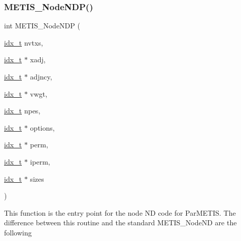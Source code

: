 \subsubsection{\texorpdfstring{M\+E\+T\+I\+S\+\_\+\+Node\+N\+D\+P()}{METIS\_NodeNDP()}}
{\footnotesize\ttfamily int M\+E\+T\+I\+S\+\_\+\+Node\+N\+DP (\begin{DoxyParamCaption}\item[{\hyperlink{a00876_aaa5262be3e700770163401acb0150f52}{idx\+\_\+t}}]{nvtxs,  }\item[{\hyperlink{a00876_aaa5262be3e700770163401acb0150f52}{idx\+\_\+t} $\ast$}]{xadj,  }\item[{\hyperlink{a00876_aaa5262be3e700770163401acb0150f52}{idx\+\_\+t} $\ast$}]{adjncy,  }\item[{\hyperlink{a00876_aaa5262be3e700770163401acb0150f52}{idx\+\_\+t} $\ast$}]{vwgt,  }\item[{\hyperlink{a00876_aaa5262be3e700770163401acb0150f52}{idx\+\_\+t}}]{npes,  }\item[{\hyperlink{a00876_aaa5262be3e700770163401acb0150f52}{idx\+\_\+t} $\ast$}]{options,  }\item[{\hyperlink{a00876_aaa5262be3e700770163401acb0150f52}{idx\+\_\+t} $\ast$}]{perm,  }\item[{\hyperlink{a00876_aaa5262be3e700770163401acb0150f52}{idx\+\_\+t} $\ast$}]{iperm,  }\item[{\hyperlink{a00876_aaa5262be3e700770163401acb0150f52}{idx\+\_\+t} $\ast$}]{sizes }\end{DoxyParamCaption})}

This function is the entry point for the node ND code for Par\+M\+E\+T\+IS. The difference between this routine and the standard M\+E\+T\+I\+S\+\_\+\+Node\+ND are the following


